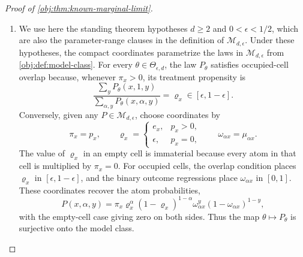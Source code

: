 \begin{proof}[Proof of \cref{obj:thm:known-marginal-limit}]
\begin{enumerate}
\[
\bigl(\psi_\varphi(z,\xi_\theta)-\upsilon_\theta\bigr)^2
=
\left(
\sum_{u\in\mathcal C_d^m}
\Bigl(\prod_{j=1}^m\xi_\theta(u_j)\Bigr)
\bigl(\varphi(z,u)-\upsilon_\theta\bigr)
\right)^2
\le
\sum_{u\in\mathcal C_d^m}
\Bigl(\prod_{j=1}^m\xi_\theta(u_j)\Bigr)
\bigl(\varphi(z,u)-\upsilon_\theta\bigr)^2 .
\]
Multiplying by \(\lambda_\theta(z)\), summing over \(z\), and then taking the supremum over \(\theta\) gives
\[
\sup_{\theta}
\sum_{z\in\mathcal Z_n}\lambda_\theta(z)
\bigl(\psi_\varphi(z,\xi_\theta)-\upsilon_\theta\bigr)^2
\le
\sup_{\theta}
\sum_{z\in\mathcal Z_n}\lambda_\theta(z)
\sum_{u\in\mathcal C_d^m}
\Bigl(\prod_{j=1}^m\xi_\theta(u_j)\Bigr)
\bigl(\varphi(z,u)-\upsilon_\theta\bigr)^2 .
\]
Taking the infimum over \(\varphi\) yields
\[
\widetilde{\mathfrak R}_\star\le \mathfrak R_m
\qquad\text{for every }m\ge0 .
\]
Taking the limit along the displayed convergence yields
\[
\widetilde{\mathfrak R}_\star\le \lim_{m\to\infty}\mathfrak R_m=\mathfrak R_\star .
\]
The two inequalities identify the ambient measurable exact-table value with the exact-side value:
\[
\widetilde{\mathfrak R}_\star=\mathfrak R_\star .
\]

\item\label{pf:known-marginal-limit:known-risk} We use here the standing
theorem hypotheses \(d\ge2\) and \(0<\epsilon<1/2\), which are also the
parameter-range clauses in the definition of \(\mathcal M_{d,\epsilon}\).
Under these hypotheses, the compact coordinates parametrize the laws in
\(\mathcal M_{d,\epsilon}\) from \cref{obj:def:model-class}.  For every \(\theta\in\Theta_{\epsilon,d}\), the law \(P_\theta\) satisfies occupied-cell overlap because, whenever \(\pi_x>0\), its treatment propensity is
\[
\frac{\sum_y P_\theta(x,1,y)}{\sum_{\alpha,y}P_\theta(x,\alpha,y)}
=\varrho_x\in[\epsilon,1-\epsilon].
\]
Conversely, given any \(P\in\mathcal M_{d,\epsilon}\), choose coordinates by
\[
\pi_x=p_x,
\qquad
\varrho_x=
\begin{cases}
 e_x, & p_x>0,\\
 \epsilon, & p_x=0,
\end{cases}
\qquad
\omega_{\alpha x}=\mu_{\alpha x}.
\]
The value of \(\varrho_x\) in an empty cell is immaterial because every atom in that cell is multiplied by \(\pi_x=0\).  For occupied cells, the overlap condition places \(\varrho_x\) in \([\epsilon,1-\epsilon]\), and the binary outcome regressions place \(\omega_{\alpha x}\) in \([0,1]\).  These coordinates recover the atom probabilities,
\[
P(x,\alpha,y)
=
\pi_x\varrho_x^\alpha(1-\varrho_x)^{1-\alpha}
\omega_{\alpha x}^y(1-\omega_{\alpha x})^{1-y},
\]
with the empty-cell case giving zero on both sides.  Thus the map \(\theta\mapsto P_\theta\) is surjective onto the model class.


\end{enumerate}
\end{proof}
